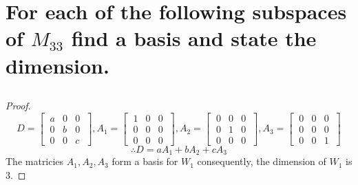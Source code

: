 \documentclass[../main.tex]{subfiles}
\begin{document}
\section{For each of the following subspaces of $M_{33}$ find a basis and state the dimension.}

\subsection{}
\begin{proof}
        $$
                D=
                \begin{bmatrix}
                        \ a & 0 & 0    \ \\
                        \ 0 & b & 0    \ \\
                        \ 0 & 0 & c \
                \end{bmatrix},
                A_{1} =
                \begin{bmatrix}
                        \ 1 & 0 & 0 \ \\
                        \ 0 & 0 & 0 \ \\
                        \ 0 & 0 & 0 \
                \end{bmatrix},
                A_{2} =
                \begin{bmatrix}
                        \ 0 & 0 & 0 \ \\
                        \ 0 & 1 & 0 \ \\
                        \ 0 & 0 & 0 \
                \end{bmatrix},
                A_{3} =
                \begin{bmatrix}
                        \ 0 & 0 & 0 \ \\
                        \ 0 & 0 & 0 \ \\
                        \ 0 & 0 & 1 \
                \end{bmatrix}
        $$
        $$\therefore D = aA_{1}+bA_{2}+cA_{3}$$
        The matricies $A_{1},A_{2},A_{3}$ form a basis for $W_1$ consequently, the dimension of $W_1$ is $3$.
\end{proof}
\end{document}
